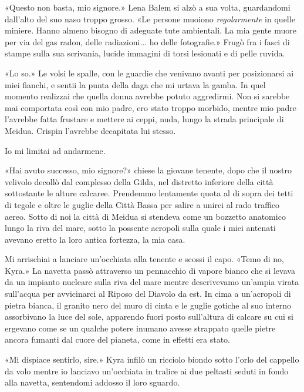«Questo non basta, mio signore.» Lena Balem si alzò a sua volta,
guardandomi dall'alto del suo naso troppo grosso. «Le persone muoiono
\emph{regolarmente} in quelle miniere. Hanno almeno bisogno di adeguate
tute ambientali. La mia gente muore per via del gas radon, delle
radiazioni... ho delle fotografie.» Frugò fra i fasci di stampe sulla
sua scrivania, lucide immagini di torsi lesionati e di pelle ruvida.

«Lo so.» Le volsi le spalle, con le guardie che venivano avanti per
posizionarsi ai miei fianchi, e sentii la punta della daga che mi urtava
la gamba. In quel momento realizzai che quella donna avrebbe potuto
aggredirmi. Non si sarebbe mai comportata così con mio padre, ero stato
troppo morbido, mentre mio padre l'avrebbe fatta frustare e mettere ai
ceppi, nuda, lungo la strada principale di Meidua. Crispin l'avrebbe
decapitata lui stesso.

Io mi limitai ad andarmene.

\begin{figure}
	\centering
	\def\svgwidth{\columnwidth}
	\scalebox{0.2}{}
\end{figure}

«Hai avuto successo, mio signore?» chiese la giovane tenente, dopo che
il nostro velivolo decollò dal complesso della Gilda, nel distretto
inferiore della città sottostante le alture calcaree. Prendemmo
lentamente quota al di sopra dei tetti di tegole e oltre le guglie della
Città Bassa per salire a unirci al rado traffico aereo. Sotto di noi la
città di Meidua si stendeva come un bozzetto anatomico lungo la riva del
mare, sotto la possente acropoli sulla quale i miei antenati avevano
eretto la loro antica fortezza, la mia casa.

Mi arrischiai a lanciare un'occhiata alla tenente e scossi il capo.
«Temo di no, Kyra.» La navetta passò attraverso un pennacchio di vapore
bianco che si levava da un impianto nucleare sulla riva del mare mentre
descrivevamo un'ampia virata sull'acqua per avvicinarci al Riposo del
Diavolo da est. In cima a un'acropoli di pietra bianca, il granito nero
del muro di cinta e le guglie gotiche al suo interno assorbivano la luce
del sole, apparendo fuori posto sull'altura di calcare su cui si
ergevano come se un qualche potere inumano avesse strappato quelle
pietre ancora fumanti dal cuore del pianeta, come in effetti era stato.

«Mi dispiace sentirlo, sire.» Kyra infilò un ricciolo biondo sotto
l'orlo del cappello da volo mentre io lanciavo un'occhiata in tralice ai
due peltasti seduti in fondo alla navetta, sentendomi addosso il loro
sguardo.

